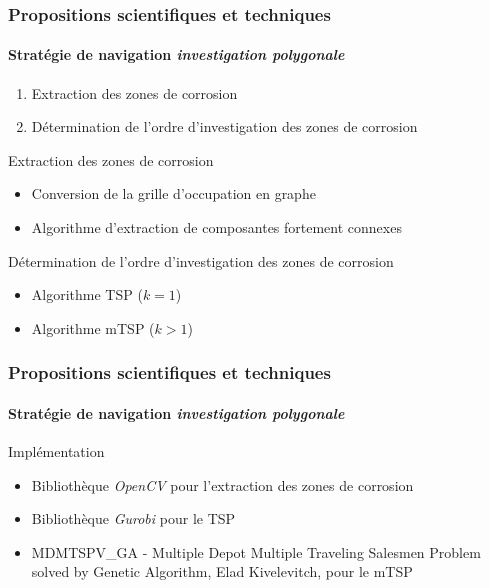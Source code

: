 \documentclass{beamer}
\begin{document}
			\begin{frame}
				\frametitle{Propositions scientifiques et techniques}
				\framesubtitle{Stratégie de navigation \textit{investigation polygonale}}
				\begin{enumerate}
					\item Extraction des zones de corrosion
					\item Détermination de l'ordre d'investigation des zones de corrosion
				\end{enumerate}
				\begin{block}{Extraction des zones de corrosion}
					\begin{itemize}
						\item Conversion de la grille d'occupation en graphe
						\item Algorithme d'extraction de composantes fortement connexes
					\end{itemize}
				\end{block}
				\begin{block}{Détermination de l'ordre d'investigation des zones de corrosion}
					\begin{itemize}
						\item Algorithme TSP ($k = 1$)
						\item Algorithme mTSP ($k > 1$)
					\end{itemize}
				\end{block}
			\end{frame}
			\begin{frame}
				\frametitle{Propositions scientifiques et techniques}
				\framesubtitle{Stratégie de navigation \textit{investigation polygonale}}
				Implémentation
				\begin{itemize}
					\item Bibliothèque \textit{OpenCV} pour l'extraction des zones de corrosion
					\item Bibliothèque \textit{Gurobi} pour le TSP
					\item MDMTSPV\_GA - Multiple Depot Multiple Traveling Salesmen Problem solved by Genetic Algorithm, Elad Kivelevitch, pour le mTSP
				\end{itemize}
			\end{frame}
\end{document}
